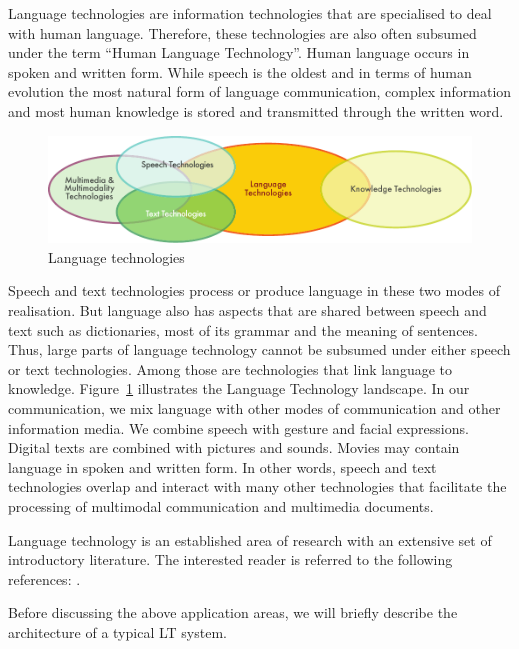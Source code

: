 \begin{multicols}{2}

Language technologies are information technologies that are specialised to deal with human language. Therefore, these technologies are also often subsumed under the term ``Human Language Technology''. Human language occurs in spoken and written form. While speech is the oldest and in terms of human evolution the most natural form of language communication, complex information and most human knowledge is stored and transmitted through the written word.

\begin{figure}[htb]
  \center
  \includegraphics[width=\textwidth]{../_media/english/language_technologies}
  \caption{Language technologies}
  \label{fig:ltincontext_en}
\end{figure}

Speech and text technologies process or produce language in these two modes of realisation. But language also has aspects that are shared between speech and text such as dictionaries, most of its grammar and the meaning of sentences. Thus, large parts of language technology cannot be subsumed under either speech or text technologies. Among those are technologies that link language to knowledge. Figure~\ref{fig:ltincontext_en}  illustrates the Language Technology landscape. In our communication, we mix language with other modes of communication and other information media. We combine speech with gesture and facial expressions. Digital texts are combined with pictures and sounds. Movies may contain language in spoken and written form. In other words, speech and text technologies overlap and interact with many other technologies that facilitate the processing of multimodal communication and multimedia documents.  


Language technology is an established area of research with an extensive set of introductory literature. The interested reader is referred to the following references:  \cite{jurafsky-martin01, manning-schuetze1, lt-world1, lt-survey1}.

Before discussing the above application areas, we will briefly describe the architecture of a typical LT system.


\end{multicols}

